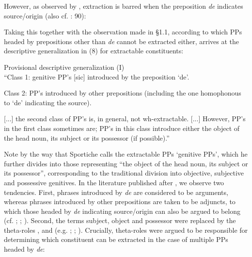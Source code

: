 \documentclass[output=paper]{langsci/langscibook}
\begin{document}
However, as observed by \citet[225]{Sportiche1981}, extraction is barred when the preposition \textit{de} indicates source/origin (also cf. \citealt{Tellier1991}: 90):

\ea%
    \label{ex:mensch:7}
    \z
\z

Taking this together with the observation made in §1.1, according to which PPs headed by prepositions other than \textit{de} cannot be extracted either, \citet{Sportiche1981} arrives at the descriptive generalization in (8) for extractable constituents:

\begin{exe}
\ex%
\label{ex:mensch:8}
Provisional descriptive generalization (I)\\
\noindent “Class 1: genitive PP’s [sic] introduced by the preposition ‘de’.

Class 2: PP’s introduced by other prepositions (including the one homophonous to ‘de’ indicating the source).

[...] the second class of PP’s is, in general, not wh-extractable. [...] However, PP’s in the first class sometimes are; PP’s in this class introduce either the object of the head noun, its subject or its possessor (if possible).” \citep[225]{Sportiche1981}
\end{exe}

Note by the way that Sportiche calls the extractable PPs ‘genitive PPs’, which he further divides into those representing “the object of the head noun, its subject or its possessor”, corresponding to the traditional division into objective, subjective and possessive genitives. In the literature published after \citet{Sportiche1981}, we observe two tendencies. First, phrases introduced by \textit{de} are considered to be arguments, whereas phrases introduced by other prepositions are taken to be adjuncts, to which those headed by \textit{de} indicating source/origin can also be argued to belong (cf. \citealt{Cinque1990}; \citealt{Moritz1994}; \citealt[586]{Alexiadou2007Noun}). Second, the terms subject, object and possessor were replaced by the theta-roles \AGENT, \THEME and \POSSESSOR (e.g. \citealt{Pollock1989}; \citealt{Valois1991}; \citealt{Godard1992}). Crucially, theta-roles were argued to be responsible for determining which constituent can be extracted in the case of multiple PPs headed by \textit{de}:
\end{document}
